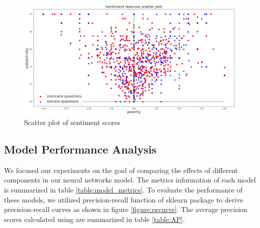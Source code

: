\documentclass[12pt]{diazessay} %
\begin{document}
{\begin{figure}
     \includegraphics[width=\textwidth]{graphs/sentiment_scatter.png}
     \caption{Scatter plot of sentiment scores}
     \label{sentiment_scatter}
 \end{figure} 


\subsection{Model Performance Analysis} %
\label{sub:model_performance_analysis}

We focused our experiments on the goal of comparing the effects of different components in our neural networks model. The metrics information of each model is summarized in table \ref{table:model_metrics}. To evaluate the performance of these models, we utilized precision-recall function of sklearn package to derive precision-recall curves as shown in figure \ref{figure:prcurve}. The average precision scores calculated using  are summarized in table \ref{table:AP}.

}
\end{document}
